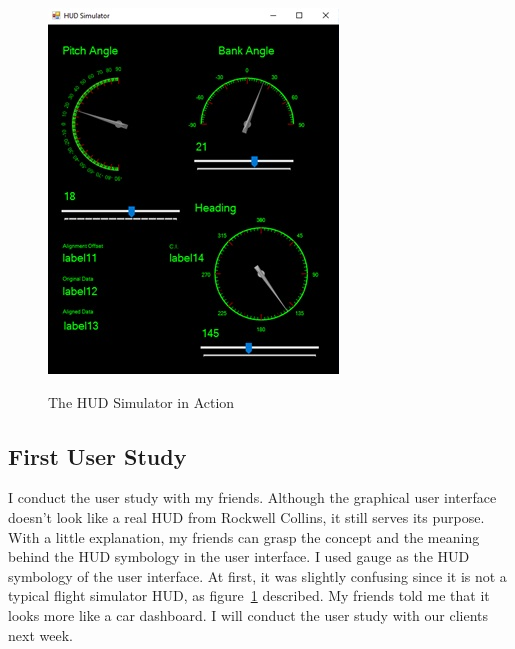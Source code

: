 \begin{figure}
    \caption{The HUD Simulator in Action}
    \includegraphics{img/hudsimaction}
    \label{fig:hudsimaction}
\end{figure}

\subsection{First User Study}
I conduct the user study with my friends. Although the graphical user interface doesn’t look like a real HUD from Rockwell Collins, it still serves its purpose. With a little explanation, my friends can grasp the concept and the meaning behind the HUD symbology in the user interface. I used gauge as the HUD symbology of the user interface. At first, it was slightly confusing since it is not a typical flight simulator HUD, as figure~\ref{fig:hudsimaction} described. My friends told me that it looks more like a car dashboard. I will conduct the user study with our clients next week.  






